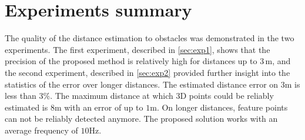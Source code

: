 \section{Experiments summary}
The quality of the distance estimation to obstacles was demonstrated in the two experiments.
The first experiment, described in \autoref{sec:exp1}, shows that the precision of the proposed method is relatively high for distances up to $3\,$m, and the second experiment, described in \autoref{sec:exp2} provided further insight into the statistics of the error over longer distances. 
The estimated distance error on $3$m is less than $3\%$.
The maximum distance at which 3D points could be reliably estimated is $8$m with an error of up to $1$m.
On longer distances, feature points can not be reliably detected anymore.
The proposed solution works with an average frequency of $10$Hz.
